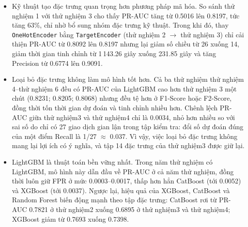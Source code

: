 \begin{itemize}
    \item Kỹ thuật tạo đặc trưng quan trọng hơn phương pháp mã hóa. So sánh thử nghiệm 1 với thử nghiệm 3 cho thấy PR-AUC tăng từ 0{.}5016 lên 0{.}8197, tức tăng 63\%, chỉ nhờ bổ sung nhóm đặc trưng kỹ thuật. Trong khi đó, thay \texttt{OneHotEncoder} bằng \texttt{TargetEncoder} (thử nghiệm 2 $\to$ thử nghiệm 3) chỉ cải thiện PR-AUC từ 0{.}8092 lên 0{.}8197 nhưng lại giảm số chiều từ 26 xuống 14, giảm thời gian tinh chỉnh từ 1\,143{.}26 giây xuống 231{.}85 giây và tăng Precision từ 0{.}6774 lên 0{.}9091.
    \item Loại bỏ đặc trưng không làm mô hình tốt hơn. Cả ba thử nghiệm thử nghiệm 4--thử nghiệm 6 đều có PR-AUC của LightGBM cao hơn thử nghiệm 3 một chút (0{.}8231; 0{.}8205; 0{.}8068) nhưng đều tệ hơn ở F1-Score hoặc F2-Score, đồng thời tốn thời gian dự đoán và tinh chỉnh nhiều hơn. Chênh lệch PR-AUC giữa thử nghiệm3 và thử nghiệm4 chỉ là 0{.}0034, nhỏ hơn nhiều so với sai số do chỉ có 27 giao dịch gian lận trong tập kiểm tra: đổi số dự đoán đúng của một điểm Recall là 1/27 $\approx$ 0{.}037. Vì vậy, việc loại bỏ đặc trưng không mang lại lợi ích có ý nghĩa, và tập 14 đặc trưng của thử nghiệm3 được giữ lại.
    \item LightGBM là thuật toán bền vững nhất. Trong năm thử nghiệm có LightGBM, mô hình này dẫn đầu về PR-AUC ở cả năm thử nghiệm, đồng thời luôn giữ FPR ở mức 0{.}0003--0{.}0017, thấp hơn hẳn CatBoost (tới 0{.}0052) và XGBoost (tới 0{.}0037). Ngược lại, hiệu quả của XGBoost, CatBoost và Random Forest biến động mạnh theo tập đặc trưng: CatBoost rơi từ PR-AUC 0{.}7821 ở thử nghiệm2 xuống 0{.}6895 ở thử nghiệm3 và thử nghiệm4; XGBoost giảm từ 0{.}7693 xuống 0{.}7398.
\end{itemize}

